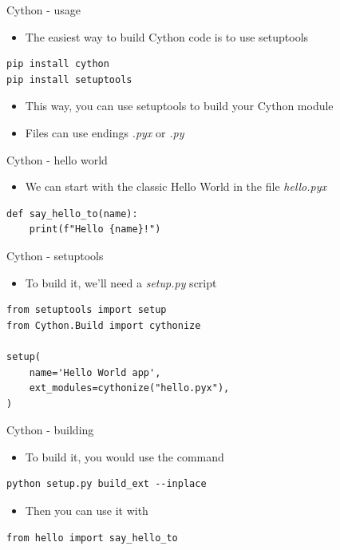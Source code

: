 \documentclass[presentation]{beamer}
\begin{document}
\begin{frame}[label=cython---usage,fragile]{Cython - usage}
 \begin{itemize}
\item The easiest way to build Cython code is to use setuptools
\end{itemize}

\begin{verbatim}
pip install cython
pip install setuptools
\end{verbatim}

\begin{itemize}
\item This way, you can use setuptools to build your Cython module
\item Files can use endings \emph{.pyx} or \emph{.py}
\end{itemize}
\end{frame}
\begin{frame}[label=cython---hello-world,fragile]{Cython - hello world}
 \begin{itemize}
\item We can start with the classic \alert{Hello World} in the file \alert{\emph{hello.pyx}}
\end{itemize}

\begin{verbatim}
def say_hello_to(name):
    print(f"Hello {name}!")
\end{verbatim}
\end{frame}
\begin{frame}[label=cython---setuptools,fragile]{Cython - setuptools}
 \begin{itemize}
\item To build it, we'll need a \emph{setup.py} script
\end{itemize}

\begin{verbatim}
from setuptools import setup
from Cython.Build import cythonize

setup(
    name='Hello World app',
    ext_modules=cythonize("hello.pyx"),
)
\end{verbatim}
\end{frame}
\begin{frame}[label=cython---building,fragile]{Cython - building}
 \begin{itemize}
\item To build it, you would use the command
\end{itemize}

\begin{verbatim}
python setup.py build_ext --inplace
\end{verbatim}

\begin{itemize}
\item Then you can use it with
\end{itemize}

\begin{verbatim}
from hello import say_hello_to
\end{verbatim}
\end{frame}
\end{document}
